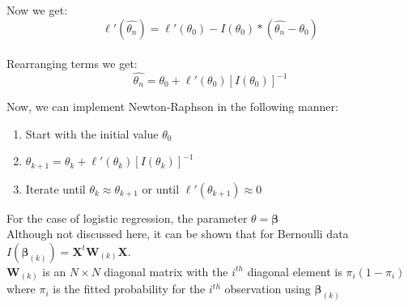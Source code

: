\documentclass{article}
\begin{document}
Now we get:
$$
\ell'(\hat{\theta_n}) = \ell'(\theta_0) - I(\theta_0)*(\hat{\theta_n} - \theta_0)
$$
\\
Rearranging terms we get:
$$
\hat{\theta_n} = \theta_0 + \ell'(\theta_0)[I(\theta_0)]^{-1}
$$

\noindent Now, we can implement Newton-Raphson in the following manner:

\begin{enumerate}
    \item Start with the initial value $\theta_0$
    \item $\theta_{k+1} = \theta_k + \ell'(\theta_k)[I(\theta_k)]^{-1}$
    \item Iterate until $\theta_k \approx \theta_{k+1}$ or until $\ell'(\theta_{k+1}) \approx 0$
\end{enumerate}

\noindent For the case of logistic regression, the parameter $\theta = \boldsymbol{\beta}$\\

\noindent Although not discussed here, it can be shown that for Bernoulli data $I(\boldsymbol{\beta}_{(k)}) = \boldsymbol{X}^t \boldsymbol{W}_{(k)} \boldsymbol{X}$.\\

\noindent $\boldsymbol{W}_{(k)}$ is an $N \times N$ diagonal matrix with the $i^{th}$ diagonal element is $\pi_i(1-\pi_i)$ where $\pi_i$ is the fitted probability for the $i^{th}$ observation using $\boldsymbol{\beta}_{(k)}$\\
\end{document}
